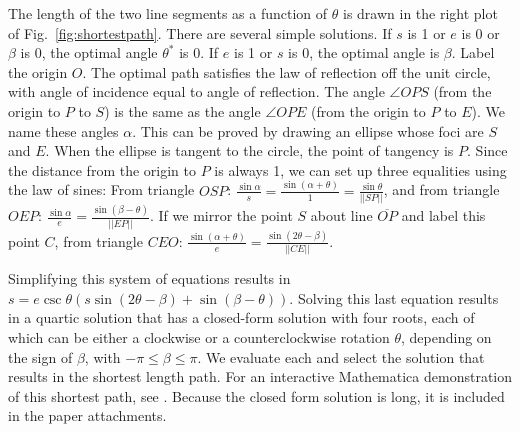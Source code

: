  
 The length of the two line segments as a function of $\theta$ is drawn in the right plot of Fig.~\ref{fig:shortestpath}. There are several simple solutions. If $s$ is 1 or $e$ is 0 or $\beta$ is 0, the optimal angle $\theta^*$ is 0. If $e$ is 1 or $s$ is 0, the optimal angle is $\beta$. Label the origin $O$. 
 The optimal path satisfies the law of reflection off the unit circle, with angle of incidence equal to angle of reflection.
 The angle $\angle{OPS}$ (from the origin to $P$ to $S$) is the same as the angle $\angle{OPE}$ (from the origin to $P$ to $E$). 
 We name these angles $\alpha$. This can be proved by drawing an ellipse whose foci are $S$ and $E$. When the ellipse is tangent to the circle, the point of tangency is $P$. 
  Since the distance from the origin to $P$ is always 1, we can set up three equalities using the law of sines:
 From triangle $OSP$: $\frac{\sin \alpha}{s}=\frac{\sin(\alpha + \theta)}{1}=\frac{\sin \theta}{||SP||}$, and from triangle $OEP$: $\frac{\sin \alpha}{e}=\frac{\sin(\beta - \theta)}{||EP||}$. If we mirror the point $S$ about line $\overline{OP}$ and label this point $C$, from triangle $CEO$: $\frac{\sin(\alpha + \theta)}{e}=\frac{\sin(2 \theta - \beta)}{||CE||}$.
 
 Simplifying this system of equations results in $s=e \csc \theta (s \sin(2 \theta-\beta)+\sin(\beta-\theta))$. Solving this last equation results in a quartic solution that has a closed-form solution with four roots, each of which can be either a clockwise or a counterclockwise rotation $\theta$, depending on the sign of $\beta$, with $-\pi\leq\beta\leq\pi$. We evaluate each and select the solution that results in the shortest length path. %
 For an interactive Mathematica demonstration of this shortest path, see \cite{BeckerShortestPath}. Because the closed form solution is long, it is included in the paper attachments.
 
 

 
 
  
 